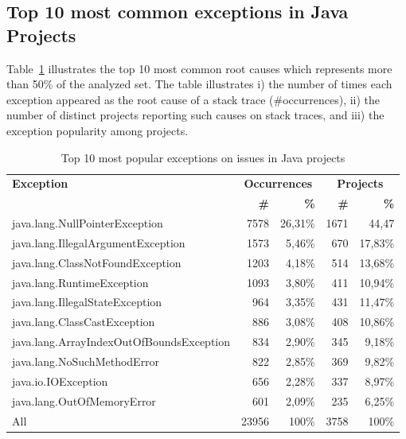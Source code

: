 \documentclass[conference]{IEEEtran}
\begin{document}
\subsection{Top 10 most common exceptions in Java Projects}

Table~\ref{tab:toptenjava} illustrates the top 10 most common root causes which
represents more than 50\% of the analyzed set. The table illustrates  i) the
number of times each exception appeared as the root cause of a stack trace
(\#occurrences), ii) the number of distinct projects reporting such causes on
stack traces, and iii) the exception popularity among projects.

\begin{table}
\begin{tabular}{lrrrr}
    \hline
    \bfseries{Exception} &  \multicolumn{2}{c}{\bfseries{Occurrences}} &  \multicolumn{2}{c}{\bfseries{Projects}}\\
    & \bfseries{\#} &  \bfseries{\%} & \bfseries{\# } & \bfseries{\% } \\
    \hline
java.lang.NullPointerException             & 7578 & 26,31\% & 1671 & 44,47 \\
java.lang.IllegalArgumentException         & 1573 & 5,46\%  & 670  & 17,83\% \\
java.lang.ClassNotFoundException           & 1203 & 4,18\%  & 514  & 13,68\% \\
java.lang.RuntimeException                 & 1093 & 3,80\%  & 411  & 10,94\% \\
java.lang.IllegalStateException            & 964  & 3,35\%  & 431  & 11,47\% \\
java.lang.ClassCastException               & 886  & 3,08\%  & 408  & 10,86\% \\
java.lang.ArrayIndexOutOfBoundsException   & 834  & 2,90\%  & 345  & 9,18\% \\
java.lang.NoSuchMethodError                & 822  & 2,85\%  & 369  & 9,82\% \\
java.io.IOException                        & 656  & 2,28\%  & 337  & 8,97\% \\
java.lang.OutOfMemoryError                 & 601  & 2,09\%  & 235  & 6,25\% \\
\hline
All	 &	23956 &	100\%	& 3758 & 100\%	 \\
\hline
  \end{tabular}
\caption{Top 10 most popular exceptions on issues in Java projects}
\label{tab:toptenjava}
\end{table}
\end{document}
